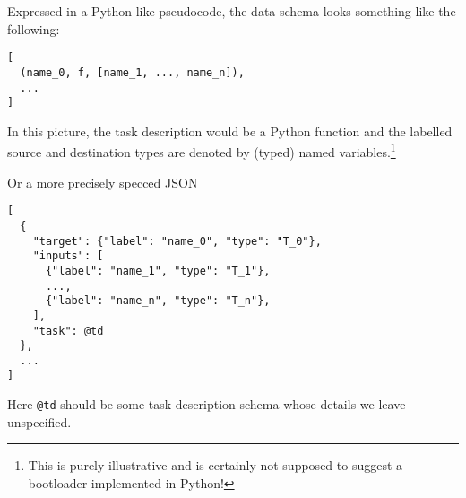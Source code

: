 Expressed in a Python-like pseudocode, the data schema looks something like the following:

\begin{lstlisting}
[
  (name_0, f, [name_1, ..., name_n]),
  ...
]
\end{lstlisting}

In this picture, the task description would be a Python function and the labelled source and destination types are denoted by (typed) named variables.\footnote{This is purely illustrative and is certainly not supposed to
suggest a bootloader implemented in Python!}

Or a more precisely specced JSON

\begin{comment}
\begin{Shaded}
\begin{Highlighting}[]
\OtherTok{[}
    \FunctionTok{\{}
        \DataTypeTok{"target"}\FunctionTok{:} \FunctionTok{\{}\DataTypeTok{"label"}\FunctionTok{:} \StringTok{"name\_0"}\FunctionTok{,} \DataTypeTok{"type"}\FunctionTok{:} \StringTok{"T\_0"}\FunctionTok{\},}
        \DataTypeTok{"inputs"}\FunctionTok{:} \OtherTok{[}
            \FunctionTok{\{}\DataTypeTok{"label"}\FunctionTok{:} \StringTok{"name\_1"}\FunctionTok{,} \DataTypeTok{"type"}\FunctionTok{:} \StringTok{"T\_1"}\FunctionTok{\}}\OtherTok{,}
            \ErrorTok{...}\OtherTok{,}
            \FunctionTok{\{}\DataTypeTok{"label"}\FunctionTok{:} \StringTok{"name\_n"}\FunctionTok{,} \DataTypeTok{"type"}\FunctionTok{:} \StringTok{"T\_n"}\FunctionTok{\}}\OtherTok{,}
        \OtherTok{]}\FunctionTok{,}
        \DataTypeTok{"task"}\FunctionTok{:} \ErrorTok{@td}
    \FunctionTok{\}}\OtherTok{,}
    \ErrorTok{...}
\OtherTok{]}
\end{Highlighting}
\end{Shaded}
\end{comment}

\begin{lstlisting}
[
  {
    "target": {"label": "name_0", "type": "T_0"},
    "inputs": [
      {"label": "name_1", "type": "T_1"},
      ...,
      {"label": "name_n", "type": "T_n"},
    ],
    "task": @td
  },
  ...
]
\end{lstlisting}

Here \texttt{@td} should be some task description schema whose details we leave unspecified.

